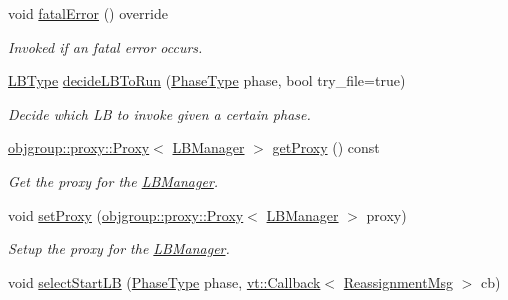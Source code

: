 \begin{DoxyCompactItemize}
void \hyperlink{structvt_1_1vrt_1_1collection_1_1balance_1_1_l_b_manager_ac13941c766e8b1b34c8591515e7942d3}{fatal\+Error} () override
\begin{DoxyCompactList}\small\item\em Invoked if an fatal error occurs. \end{DoxyCompactList}\item 
\hyperlink{namespacevt_1_1vrt_1_1collection_1_1balance_ac4f99693509affcc67db182d4aad9b5c}{L\+B\+Type} \hyperlink{structvt_1_1vrt_1_1collection_1_1balance_1_1_l_b_manager_a6c610e1c053f986932d8a59bb89eb37d}{decide\+L\+B\+To\+Run} (\hyperlink{namespacevt_a46ce6733d5cdbd735d561b7b4029f6d7}{Phase\+Type} phase, bool try\+\_\+file=true)
\begin{DoxyCompactList}\small\item\em Decide which LB to invoke given a certain phase. \end{DoxyCompactList}\item 
\hyperlink{structvt_1_1objgroup_1_1proxy_1_1_proxy}{objgroup\+::proxy\+::\+Proxy}$<$ \hyperlink{structvt_1_1vrt_1_1collection_1_1balance_1_1_l_b_manager}{L\+B\+Manager} $>$ \hyperlink{structvt_1_1vrt_1_1collection_1_1balance_1_1_l_b_manager_aa0fbba6d90873e5fa6e40767efcabb5c}{get\+Proxy} () const
\begin{DoxyCompactList}\small\item\em Get the proxy for the \hyperlink{structvt_1_1vrt_1_1collection_1_1balance_1_1_l_b_manager}{L\+B\+Manager}. \end{DoxyCompactList}\item 
void \hyperlink{structvt_1_1vrt_1_1collection_1_1balance_1_1_l_b_manager_aacef5b639acd9d984b9bcb79ecb9c6a9}{set\+Proxy} (\hyperlink{structvt_1_1objgroup_1_1proxy_1_1_proxy}{objgroup\+::proxy\+::\+Proxy}$<$ \hyperlink{structvt_1_1vrt_1_1collection_1_1balance_1_1_l_b_manager}{L\+B\+Manager} $>$ proxy)
\begin{DoxyCompactList}\small\item\em Setup the proxy for the \hyperlink{structvt_1_1vrt_1_1collection_1_1balance_1_1_l_b_manager}{L\+B\+Manager}. \end{DoxyCompactList}\item 
void \hyperlink{structvt_1_1vrt_1_1collection_1_1balance_1_1_l_b_manager_acf2b5982f927c631c4ac9bd6627105ce}{select\+Start\+LB} (\hyperlink{namespacevt_a46ce6733d5cdbd735d561b7b4029f6d7}{Phase\+Type} phase, \hyperlink{namespacevt_a57b238783d05de96bc2c4027f7073b7f}{vt\+::\+Callback}$<$ \hyperlink{structvt_1_1vrt_1_1collection_1_1balance_1_1_reassignment_msg}{Reassignment\+Msg} $>$ cb)

\end{DoxyCompactItemize}
